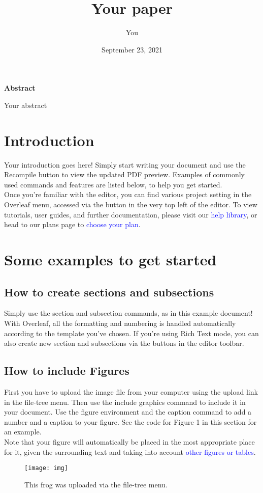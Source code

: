 \documentclass{article}
\title{Your paper}
\author{You}
\date{September 23, 2021}
\begin{document}
		\maketitle
		\begin{center}
	\textbf{Abstract}
\end{center}

	Your abstract
	\section{Introduction}
	Your introduction goes here! Simply start writing your document and use the Recompile button to
	view the updated PDF preview. Examples of commonly used commands and features are listed below,
	to help you get started.\\
	
	Once you’re familiar with the editor, you can find various project setting in the Overleaf menu,
	accessed via the button in the very top left of the editor. To view tutorials, user guides, and further
	documentation, please visit our \textcolor{blue}{help library}, or head to our plans page to \textcolor{blue}{choose your plan}.
	
	
	\section{Some examples to get started}
	\subsection{How to create sections and subsections}
	Simply use the section and subsection commands, as in this example document! With Overleaf, all
	the formatting and numbering is handled automatically according to the template you’ve chosen. If
	you’re using Rich Text mode, you can also create new section and subsections via the buttons in the
	editor toolbar.
		\subsection{How to include Figures}
First you have to upload the image file from your computer using the upload link in the file-tree menu.
Then use the include graphics command to include it in your document. Use the figure environment
and the caption command to add a number and a caption to your figure. See the code for Figure 1 in
this section for an example.\\

Note that your figure will automatically be placed in the most appropriate place for it, given the
surrounding text and taking into account \textcolor{blue}{other figures or tables}.
\begin{figure}
	\begin{center}
\texttt{[image: img]}
\caption{This frog was uploaded via the file-tree menu.}
\end{center}
\end{figure}
\newpage
\end{document}

